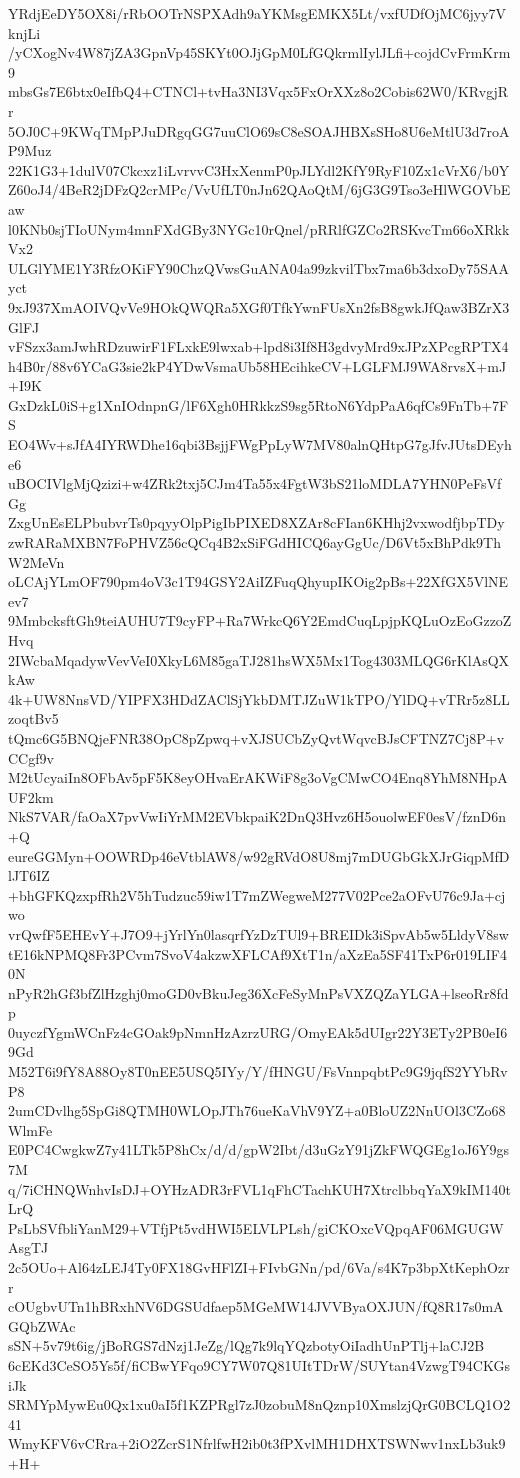YRdjEeDY5OX8i/rRbOOTrNSPXAdh9aYKMsgEMKX5Lt/vxfUDfOjMC6jyy7VknjLi
/yCXogNv4W87jZA3GpnVp45SKYt0OJjGpM0LfGQkrmlIylJLfi+cojdCvFrmKrm9
mbsGs7E6btx0eIfbQ4+CTNCl+tvHa3NI3Vqx5FxOrXXz8o2Cobis62W0/KRvgjRr
5OJ0C+9KWqTMpPJuDRgqGG7uuClO69sC8eSOAJHBXsSHo8U6eMtlU3d7roAP9Muz
22K1G3+1dulV07Ckcxz1iLvrvvC3HxXenmP0pJLYdl2KfY9RyF10Zx1cVrX6/b0Y
Z60oJ4/4BeR2jDFzQ2crMPc/VvUfLT0nJn62QAoQtM/6jG3G9Tso3eHlWGOVbEaw
l0KNb0sjTIoUNym4mnFXdGBy3NYGc10rQnel/pRRlfGZCo2RSKvcTm66oXRkkVx2
ULGlYME1Y3RfzOKiFY90ChzQVwsGuANA04a99zkvilTbx7ma6b3dxoDy75SAAyct
9xJ937XmAOIVQvVe9HOkQWQRa5XGf0TfkYwnFUsXn2fsB8gwkJfQaw3BZrX3GlFJ
vFSzx3amJwhRDzuwirF1FLxkE9lwxab+lpd8i3If8H3gdvyMrd9xJPzXPcgRPTX4
h4B0r/88v6YCaG3sie2kP4YDwVsmaUb58HEcihkeCV+LGLFMJ9WA8rvsX+mJ+I9K
GxDzkL0iS+g1XnIOdnpnG/lF6Xgh0HRkkzS9sg5RtoN6YdpPaA6qfCs9FnTb+7FS
EO4Wv+sJfA4IYRWDhe16qbi3BsjjFWgPpLyW7MV80alnQHtpG7gJfvJUtsDEyhe6
uBOCIVlgMjQzizi+w4ZRk2txj5CJm4Ta55x4FgtW3bS21loMDLA7YHN0PeFsVfGg
ZxgUnEsELPbubvrTs0pqyyOlpPigIbPIXED8XZAr8cFIan6KHhj2vxwodfjbpTDy
zwRARaMXBN7FoPHVZ56cQCq4B2xSiFGdHICQ6ayGgUc/D6Vt5xBhPdk9ThW2MeVn
oLCAjYLmOF790pm4oV3c1T94GSY2AiIZFuqQhyupIKOig2pBs+22XfGX5VlNEev7
9MmbcksftGh9teiAUHU7T9cyFP+Ra7WrkcQ6Y2EmdCuqLpjpKQLuOzEoGzzoZHvq
2IWcbaMqadywVevVeI0XkyL6M85gaTJ281hsWX5Mx1Tog4303MLQG6rKlAsQXkAw
4k+UW8NnsVD/YIPFX3HDdZAClSjYkbDMTJZuW1kTPO/YlDQ+vTRr5z8LLzoqtBv5
tQmc6G5BNQjeFNR38OpC8pZpwq+vXJSUCbZyQvtWqvcBJsCFTNZ7Cj8P+vCCgf9v
M2tUcyaiIn8OFbAv5pF5K8eyOHvaErAKWiF8g3oVgCMwCO4Enq8YhM8NHpAUF2km
NkS7VAR/faOaX7pvVwIiYrMM2EVbkpaiK2DnQ3Hvz6H5ouolwEF0esV/fznD6n+Q
eureGGMyn+OOWRDp46eVtblAW8/w92gRVdO8U8mj7mDUGbGkXJrGiqpMfDlJT6IZ
+bhGFKQzxpfRh2V5hTudzuc59iw1T7mZWegweM277V02Pce2aOFvU76c9Ja+cjwo
vrQwfF5EHEvY+J7O9+jYrlYn0lasqrfYzDzTUl9+BREIDk3iSpvAb5w5LldyV8sw
tE16kNPMQ8Fr3PCvm7SvoV4akzwXFLCAf9XtT1n/aXzEa5SF41TxP6r019LIF40N
nPyR2hGf3bfZlHzghj0moGD0vBkuJeg36XcFeSyMnPsVXZQZaYLGA+lseoRr8fdp
0uyczfYgmWCnFz4cGOak9pNmnHzAzrzURG/OmyEAk5dUIgr22Y3ETy2PB0eI69Gd
M52T6i9fY8A88Oy8T0nEE5USQ5IYy/Y/fHNGU/FsVnnpqbtPc9G9jqfS2YYbRvP8
2umCDvlhg5SpGi8QTMH0WLOpJTh76ueKaVhV9YZ+a0BloUZ2NnUOl3CZo68WlmFe
E0PC4CwgkwZ7y41LTk5P8hCx/d/d/gpW2Ibt/d3uGzY91jZkFWQGEg1oJ6Y9gs7M
q/7iCHNQWnhvIsDJ+OYHzADR3rFVL1qFhCTachKUH7XtrclbbqYaX9kIM140tLrQ
PsLbSVfbliYanM29+VTfjPt5vdHWI5ELVLPLsh/giCKOxcVQpqAF06MGUGWAsgTJ
2c5OUo+Al64zLEJ4Ty0FX18GvHFlZI+FIvbGNn/pd/6Va/s4K7p3bpXtKephOzrr
cOUgbvUTn1hBRxhNV6DGSUdfaep5MGeMW14JVVByaOXJUN/fQ8R17s0mAGQbZWAc
sSN+5v79t6ig/jBoRGS7dNzj1JeZg/lQg7k9lqYQzbotyOiIadhUnPTlj+laCJ2B
6cEKd3CeSO5Ys5f/fiCBwYFqo9CY7W07Q81UItTDrW/SUYtan4VzwgT94CKGsiJk
SRMYpMywEu0Qx1xu0aI5f1KZPRgl7zJ0zobuM8nQznp10XmslzjQrG0BCLQ1O241
WmyKFV6vCRra+2iO2ZcrS1NfrlfwH2ib0t3fPXvlMH1DHXTSWNwv1nxLb3uk9+H+
